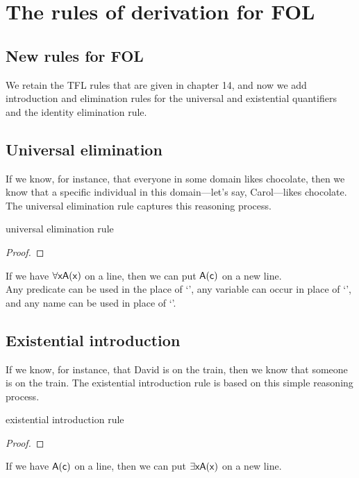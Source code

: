 \graphicspath{{figures--FOL/}}

\chapter{The rules of derivation for FOL}\label{FOL-rules}

\section{New rules for FOL}

We retain the TFL rules that are given in chapter 14, and now we add introduction and elimination rules for the universal and existential quantifiers and the identity elimination rule.

\section{Universal elimination}

If we know, for instance, that everyone in some domain likes chocolate, then we know that a specific individual in this domain---let's say, Carol---likes chocolate. The universal elimination rule captures this reasoning process. 

\begin{factboxy}{universal elimination rule}
\begin{proof}
	 
\end{proof}

\small{If we have $\forall \mathsf{x A(x)}$ on a line, then we can put $\mathsf{A(c)}$ on a new line.\\ 
Any predicate can  be used in the place of `', any variable can occur in place of `', and any name can be used in place of `'.}
\end{factboxy}


\section{Existential introduction}

If we know, for instance, that David is on the train, then we know that someone is on the train. The existential introduction rule is based on this simple reasoning process.

\begin{factboxy}{existential introduction rule}
\begin{proof}
	 
\end{proof}

\small{If we have $\mathsf{A(c)}$ on a line, then we can put $\exists \mathsf{x A(x)}$ on a new line.}
\end{factboxy}


